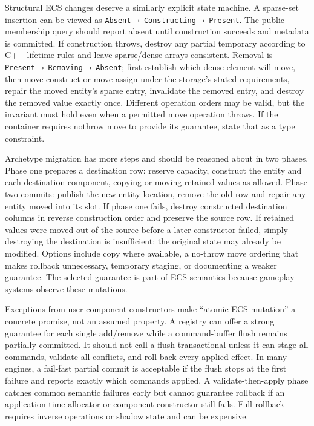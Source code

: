 Structural ECS changes deserve a similarly explicit state machine. A sparse-set insertion can be viewed as \texttt{Absent\ →\ Constructing\ →\ Present}. The public membership query should report absent until construction succeeds and metadata is committed. If construction throws, destroy any partial temporary according to C++ lifetime rules and leave sparse/dense arrays consistent. Removal is \texttt{Present\ →\ Removing\ →\ Absent}; first establish which dense element will move, then move-construct or move-assign under the storage's stated requirements, repair the moved entity's sparse entry, invalidate the removed entry, and destroy the removed value exactly once. Different operation orders may be valid, but the invariant must hold even when a permitted move operation throws. If the container requires nothrow move to provide its guarantee, state that as a type constraint.

Archetype migration has more steps and should be reasoned about in two phases. Phase one prepares a destination row: reserve capacity, construct the entity and each destination component, copying or moving retained values as allowed. Phase two commits: publish the new entity location, remove the old row and repair any entity moved into its slot. If phase one fails, destroy constructed destination columns in reverse construction order and preserve the source row. If retained values were moved out of the source before a later constructor failed, simply destroying the destination is insufficient: the original state may already be modified. Options include copy where available, a no-throw move ordering that makes rollback unnecessary, temporary staging, or documenting a weaker guarantee. The selected guarantee is part of ECS semantics because gameplay systems observe these mutations.

Exceptions from user component constructors make ``atomic ECS mutation'' a concrete promise, not an assumed property. A registry can offer a strong guarantee for each single add/remove while a command-buffer flush remains partially committed. It should not call a flush transactional unless it can stage all commands, validate all conflicts, and roll back every applied effect. In many engines, a fail-fast partial commit is acceptable if the flush stops at the first failure and reports exactly which commands applied. A validate-then-apply phase catches common semantic failures early but cannot guarantee rollback if an application-time allocator or component constructor still fails. Full rollback requires inverse operations or shadow state and can be expensive.

